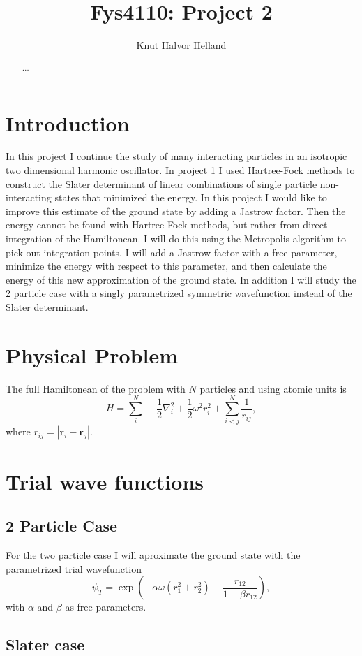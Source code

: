 \documentclass[a4paper,English,10pt]{article}
\title{Fys4110: Project 2}
\author{Knut Halvor Helland}
\newcommand{\bb}[1]{\boldsymbol{#1}}
\newcommand{\be}{\begin{equation}}
\newcommand{\ee}{\end{equation}}
\newcommand{\f}{\frac}
\begin{document}
\maketitle{}
\begin{abstract}
$\ldots$
\end{abstract}


\section{Introduction}
In this project I continue the study of many interacting particles in an isotropic two dimensional harmonic oscillator.
In project 1 \cite{proj1} I used Hartree-Fock methods to construct the Slater determinant of linear combinations of single
particle non-interacting states that minimized the energy. In this project I would like to improve this estimate of the ground state
by adding a Jastrow factor. Then the energy cannot be found with Hartree-Fock methods, but rather from direct integration of the Hamiltonean.
I will do this using the Metropolis algorithm to pick out integration points.
I will add a Jastrow factor with a free parameter, minimize the energy with respect to this parameter, and
then calculate the energy of this new approximation of the ground state.
In addition I will study the 2 particle case with a singly parametrized symmetric wavefunction instead of the Slater determinant.


\section{Physical Problem}
The full Hamiltonean of the problem with $N$ particles and using atomic units is
\be
H = \sum_i^N -\f{1}{2}\nabla^2_i + \f{1}{2}\omega^2r^2_i + \sum_{i<j}^N\f{1}{r_{ij}}, \label{ham}
\ee
where $r_{ij} = |\bb{r}_i-\bb{r}_j|$.


\section{Trial wave functions}
\subsection{2 Particle Case}
For the two particle case I will aproximate the ground state with the parametrized trial wavefunction
\be
\psi_T = \exp\left(-\alpha\omega(r_1^2 + r_2^2) -\f{r_{12}}{1+\beta r_{12}}\right),\label{2pw}
\ee
with $\alpha$ and $\beta$ as free parameters.

\subsection{Slater case}
\end{document}
